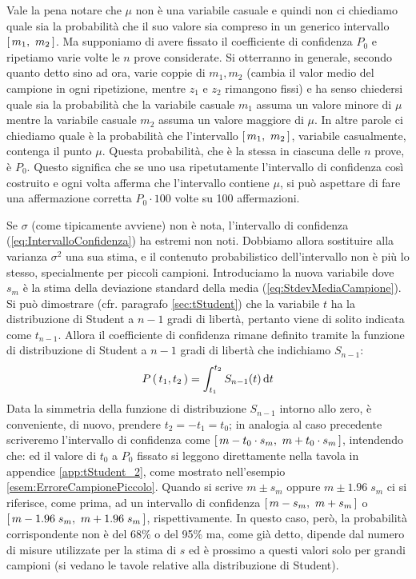 Vale la pena notare che $\mu$ non \`e una variabile casuale e
quindi non ci chiediamo quale sia la probabilit\`a che il suo
valore sia compreso in un generico intervallo $\cinterval{m_1}{m_2}$.
Ma supponiamo di avere fissato il coefficiente di confidenza $P_0$ e
ripetiamo varie volte le $n$ prove considerate. Si otterranno in generale,
secondo quanto detto sino ad ora, varie coppie di $m_1, m_2$ (cambia il valor
medio del campione in ogni ripetizione, mentre $z_1$ e $z_2$ rimangono fissi)
e ha senso chiedersi quale sia la probabilit\`a che la variabile casuale $m_1$
assuma un valore minore di $\mu$ mentre la variabile casuale $m_2$ assuma un
valore maggiore di $\mu$. In altre parole ci chiediamo quale \`e
la probabilit\`a che l'intervallo $\cinterval{m_1}{m_2}$, variabile
casualmente, contenga il punto $\mu$. Questa probabilit\`a, che \`e
la stessa in ciascuna delle $n$ prove, \`e $P_0$. Questo significa
che se uno usa ripetutamente l'intervallo di confidenza cos\`i
costruito e ogni volta afferma che l'intervallo contiene $\mu$, si
pu\`o aspettare di fare una affermazione corretta $P_0 \cdot 100$
volte su 100 affermazioni.

Se $\sigma$ (come tipicamente avviene) non \`e nota, l'intervallo
di confidenza (\ref{eq:IntervalloConfidenza})
ha estremi non noti. Dobbiamo allora sostituire alla varianza $\sigma^2$
una sua stima, e il contenuto probabilistico dell'intervallo non \`e pi\`u lo
stesso, specialmente per piccoli campioni.
Introduciamo la nuova variabile
dove $s_m$ \`e la stima della deviazione standard della media
(\ref{eq:StdevMediaCampione}). Si pu\`o dimostrare (cfr. paragrafo
\ref{sec:tStudent}) che la variabile $t$ ha la distribuzione di
Student a $n-1$ gradi di libert\`a, pertanto viene di solito
indicata come $t_{n-1}$. Allora il coefficiente di confidenza
rimane definito tramite la funzione di distribuzione di Student a
$n-1$ gradi di libert\`a che indichiamo $S_{n-1}$:
$$
\prob{t_1, t_2} = \dintegral{S_{n-1}(t)}{t}{t_1}{t_2}
$$
Data la simmetria della funzione di distribuzione $S_{n-1}$
intorno allo zero, \`e conveniente, di nuovo, prendere $t_2 = -t_1 = t_0$;
in analogia al caso precedente scriveremo l'intervallo di
confidenza come $\cinterval{m-t_0\cdot s_m}{m+t_0\cdot s_m}$, intendendo che:
ed il valore di $t_0$ a $P_0$ fissato si leggono direttamente nella tavola in
appendice \ref{app:tStudent_2}, come mostrato nell'esempio
\ref{esem:ErroreCampionePiccolo}.
Quando si scrive $m\pm s_m$ oppure $m\pm 1.96\;s_m$ ci si riferisce, come prima,
ad un intervallo di confidenza $\cinterval{m - s_m}{m + s_m}$ o
$\cinterval{m - 1.96\;s_m}{m + 1.96\;s_m}$, rispettivamente.
In questo caso, per\`o, la probabilit\`a corrispondente non \`e del
68\% o del 95\% ma, come gi\`a detto, dipende dal numero di misure utilizzate
per la stima di $s$ ed \`e prossimo a questi valori solo per grandi campioni
(si vedano le tavole relative alla distribuzione di Student).
